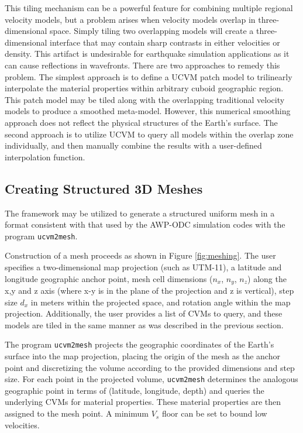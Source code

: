 This tiling mechanism can be a powerful feature for combining multiple regional velocity models, but a problem arises when velocity models overlap in three-dimensional space. Simply tiling two overlapping models will create a three-dimensional interface that may contain sharp contrasts in either velocities or density. This artifact is undesirable for earthquake simulation applications as it can cause reflections in wavefronts. There are two approaches to remedy this problem. The simplest approach is to define a UCVM patch model to trilinearly interpolate the material properties within arbitrary cuboid geographic region. This patch model may be tiled along with the overlapping traditional velocity models to produce a smoothed meta-model. However, this numerical smoothing approach does not reflect the physical structures of the Earth's surface. The second approach is to utilize UCVM to query all models within the overlap zone individually, and then manually combine the results with a user-defined interpolation function. 



\subsection{Creating Structured 3D Meshes}

The framework may be utilized to generate a structured uniform mesh in a format consistent with that used by the AWP-ODC simulation codes with the program \texttt{ucvm2mesh}.

Construction of a mesh proceeds as shown in Figure \ref{fig:meshing}. The user specifies a two-dimensional map projection (such as UTM-11), a latitude and longitude geographic anchor point, mesh cell dimensions ($n_x$, $n_y$, $n_z$) along the x,y and z axis (where x-y is in the plane of the projection and z is vertical), step size $d_x$ in meters within the projected space, and rotation angle within the map projection. Additionally, the user provides a list of CVMs to query, and these models are tiled in the same manner as was described in the previous section.

The program \texttt{ucvm2mesh} projects the geographic coordinates of the Earth's surface into the map projection, placing the origin of the mesh as the anchor point and discretizing the volume according to the provided dimensions and step size. For each point in the projected volume, \texttt{ucvm2mesh} determines the analogous geographic point in terms of (latitude, longitude, depth) and queries the underlying CVMs for material properties. These material properties are then assigned to the mesh point. A minimum $V_s$ floor can be set to bound low velocities.

